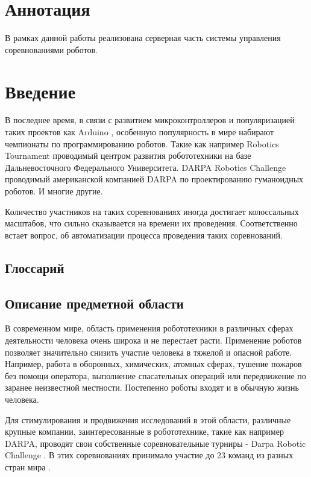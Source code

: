 \documentclass[a4paper,12pt]{article}
\begin{document}
\tableofcontents

\section*{Аннотация}
В рамках данной работы реализована серверная часть системы управления соревнованиями роботов.

\section{Введение}
В последнее время, в связи с развитием микроконтроллеров и популяризацией таких проектов как Arduino \cite{web:arduino}, особенную популярность в мире набирают чемпионаты по программированию роботов.
Такие как например Robotics Tournament \cite{web:robotournament} проводимый центром развития робототехники на базе Дальневосточного Федерального Университета. DARPA Robotics Challenge \cite{web:drc} проводимый американской компанией DARPA по проектированию гуманоидных роботов. И многие другие. 

Количество участников на таких соревнованиях иногда достигает колоссальных масштабов, что сильно сказывается на времени их проведения.
Соответственно встает вопрос, об автоматизации процесса проведения таких соревнований.

\subsection{Глоссарий}

\printglossaries

\subsection{Описание предметной области}
В современном мире, область применения робототехники в различных сферах деятельности человека очень широка и не перестает расти. Применение роботов позволяет значительно снизить участие человека в тяжелой и опасной работе. Например, работа в оборонных, химических, атомных сферах, тушение пожаров без помощи оператора, выполнение спасательных операций или передвижение по заранее неизвестной местности. Постепенно роботы входят и в обычную жизнь человека.

Для стимулирования и продвижения исследований в этой области, различные крупные компании, заинтересованные в робототехнике, такие как например DARPA, проводят свои собственные соревновательные турниры - Darpa Robotic Challenge \cite{web:drc}. В этих соревнованиях принимало участие до 23 команд из разных стран мира \cite{web:darpa-finals}.
\end{document}
